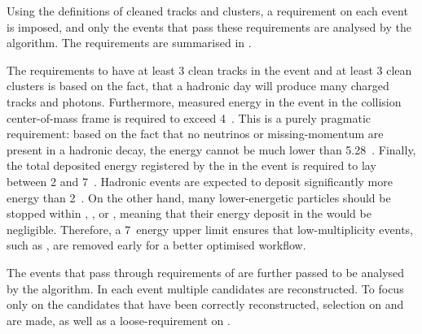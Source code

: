 Using the definitions of cleaned tracks and \ECL clusters, a requirement on each event is imposed, and only the events that pass these requirements are analysed by the \FEI algorithm.
The requirements are summarised in .

\begin{table}[htbp!]
    \centering
     \caption{\label{tab:fei_precuts} \FEI pre-selections.}
\end{table}
The requirements to have at least 3 clean tracks in the event and at least 3 clean \ECL clusters is based on the fact, that a hadronic day will produce many charged tracks and photons.
Furthermore, measured energy in the event in the \epem collision center-of-mass frame is required to exceed 4~\gev.
This is a purely pragmatic requirement: based on the fact that no neutrinos or missing-momentum are present in a hadronic decay, the energy cannot be much lower than 5.28~\gev.
Finally, the total deposited energy registered by the \ECL in the event is required to lay between 2 and 7~\gev.
Hadronic events are expected to deposit significantly more energy than 2~\gev.
On the other hand, many lower-energetic particles should be stopped within \PXD, \SVD, \CDC or \TOP, meaning that their energy deposit in the \ECL would be negligible.
Therefore, a 7~\gev \ECL energy upper limit ensures that low-multiplicity events, such as \epem\ra\epem, are removed early for a better optimised workflow.

The events that pass through requirements of  are further passed to be analysed by the \FEI algorithm.
In each event multiple \FEI candidates are reconstructed.
To focus only on the candidates that have been correctly reconstructed, selection on \DeltaE and \Mbc are made, as well as a loose-requirement on \feiProb.

